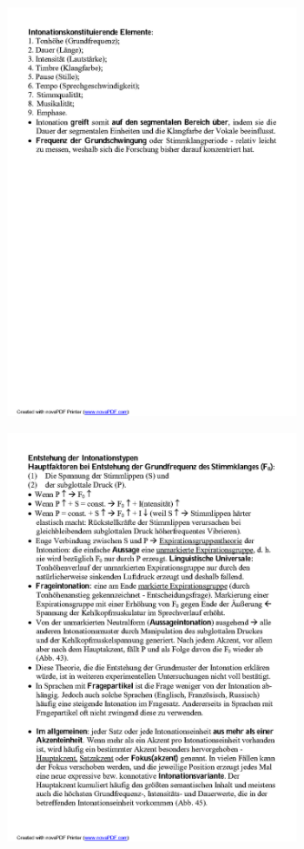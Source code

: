 \documentclass[
  letterpaper,
]{scrbook}
\begin{document}
\includegraphics[width=3.31in,height=\textheight]{./pictures/prosodie/06_Prosodie_Folie_2005-06_R_Page5.png}

\includegraphics[width=3.31in,height=\textheight]{./pictures/prosodie/06_Prosodie_Folie_2005-06_R_Page6.png}
\end{document}
